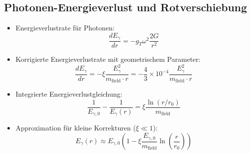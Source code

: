 \documentclass[12pt,a4paper]{article}
\begin{document}
	\subsection{Photonen-Energieverlust und Rotverschiebung}
	\begin{itemize}
		\item Energieverlustrate für Photonen:
		\begin{equation}
			\frac{dE_\gamma}{dr} = -g_T \omega^2 \frac{2G}{r^2}
		\end{equation}
		
		\item Korrigierte Energieverlustrate mit geometrischem Parameter:
		\begin{equation}
			\boxed{\frac{dE_\gamma}{dr} = -\xi \frac{E_\gamma^2}{m_{\text{field}} \cdot r} = -\frac{4}{3} \times 10^{-4} \frac{E_\gamma^2}{m_{\text{field}} \cdot r}}
		\end{equation}
		
		\item Integrierte Energieverlustgleichung:
		\begin{equation}
			\frac{1}{E_{\gamma,0}} - \frac{1}{E_\gamma(r)} = \xi \frac{\ln(r/r_0)}{m_{\text{field}}}
		\end{equation}
		
		\item Approximation für kleine Korrekturen ($\xi \ll 1$):
		\begin{equation}
			E_\gamma(r) \approx E_{\gamma,0} \left(1 - \xi \frac{E_{\gamma,0}}{m_{\text{field}}} \ln\left(\frac{r}{r_0}\right)\right)
		\end{equation}
	\end{itemize}
	
\end{document}
